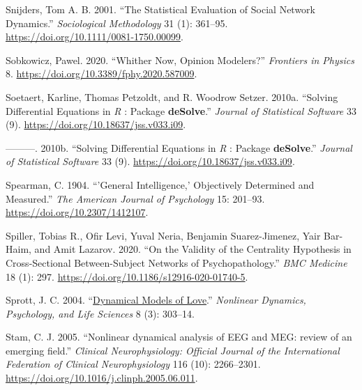 \documentclass[
  a4paper,
  DIV=11,
  numbers=noendperiod,
  oneside]{scrreprt}
\newlength{\cslhangindent}
\newlength{\cslentryspacingunit} %
\newenvironment{CSLReferences}[2] %
 {%
  \setlength{\parindent}{0pt}
  \ifodd #1
  \let\oldpar\par
  \def\par{\hangindent=\cslhangindent\oldpar}
  \fi
  \setlength{\parskip}{#2\cslentryspacingunit}
 }%
 {}
\begin{document}
\begin{CSLReferences}{1}{0}
\leavevmode{}%
Snijders, Tom A. B. 2001. {``The {Statistical Evaluation} of {Social
Network Dynamics}.''} \emph{Sociological Methodology} 31 (1): 361--95.
\url{https://doi.org/10.1111/0081-1750.00099}.

\leavevmode{}%
Sobkowicz, Pawel. 2020. {``Whither {Now}, {Opinion Modelers}?''}
\emph{Frontiers in Physics} 8.
\url{https://doi.org/10.3389/fphy.2020.587009}.

\leavevmode{}%
Soetaert, Karline, Thomas Petzoldt, and R. Woodrow Setzer. 2010a.
{``Solving {Differential Equations} in {\emph{R}} : {Package}
{\textbf{deSolve}}.''} \emph{Journal of Statistical Software} 33 (9).
\url{https://doi.org/10.18637/jss.v033.i09}.

\leavevmode{}%
---------. 2010b. {``Solving Differential Equations in {\emph{R}} :
Package {\textbf{deSolve}}.''} \emph{Journal of Statistical Software} 33
(9). \url{https://doi.org/10.18637/jss.v033.i09}.

\leavevmode{}%
Spearman, C. 1904. {``'{General} Intelligence,' Objectively Determined
and Measured.''} \emph{The American Journal of Psychology} 15: 201--93.
\url{https://doi.org/10.2307/1412107}.

\leavevmode{}%
Spiller, Tobias R., Ofir Levi, Yuval Neria, Benjamin Suarez-Jimenez,
Yair Bar-Haim, and Amit Lazarov. 2020. {``On the Validity of the
Centrality Hypothesis in Cross-Sectional Between-Subject Networks of
Psychopathology.''} \emph{BMC Medicine} 18 (1): 297.
\url{https://doi.org/10.1186/s12916-020-01740-5}.

\leavevmode{}%
Sprott, J. C. 2004.
{``\href{https://www.ncbi.nlm.nih.gov/pubmed/15233877}{Dynamical Models
of Love}.''} \emph{Nonlinear Dynamics, Psychology, and Life Sciences} 8
(3): 303--14.

\leavevmode{}%
Stam, C. J. 2005. {``Nonlinear dynamical analysis of EEG and MEG: review
of an emerging field.''} \emph{Clinical Neurophysiology: Official
Journal of the International Federation of Clinical Neurophysiology} 116
(10): 2266--2301. \url{https://doi.org/10.1016/j.clinph.2005.06.011}.


\end{CSLReferences}
\end{document}

